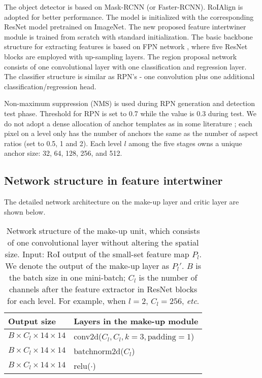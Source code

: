 \documentclass{article} \usepackage{iclr2019_conference,times}
\begin{document}
{
The object detector is based on Mask-RCNN (or Faster-RCNN).
RoIAlign is adopted for better performance. The model is initialized with the corresponding ResNet model pretrained on ImageNet. The new proposed feature intertwiner module is trained from scratch with standard initialization. The basic backbone structure for extracting features is based on FPN network \citep{lin2017_FPN}, where five ResNet blocks are employed with up-sampling layers. The region proposal network consists of one convolutional layer with one classification and regression layer.
The classifier structure is similar as RPN's - one convolution plus one additional classification/regression head.}

Non-maximum suppression (NMS) is used during RPN generation and detection test phase. Threshold for RPN is set to 0.7 while the value is 0.3 during test.
We do not adopt a dense allocation of anchor templates as in some literature \citep{liu2015_ssd,redmon2017_yolo_v1}; each pixel on a level only has the number of anchors the same as the number of aspect ratios (set to 0.5, 1 and 2). Each level $l$ among the five stages owns a unique anchor size: 32, 64, 128, 256, and 512.  
{
\subsection{Network structure in feature intertwiner}\label{sec:network_feat_inter}}

{	
The detailed network architecture on the make-up layer and critic layer are shown below.
}

\begin{table*}[h]
	\centering
	\begin{tabular}{   l |  l}
		Output size & Layers in the make-up module \\ \toprule
		$B \times C_l \times 14 \times 14$ & conv2d($C_l, C_l, k=3, \text{padding}=1$) \\
		$B \times C_l \times 14 \times 14$ & batchnorm2d($C_l$) \\
		$B \times C_l \times 14 \times 14$ & relu($\cdot$) \\
	\end{tabular}
	\vspace{-.2cm}
	\caption{
{
		Network structure of the make-up unit, which consists of one convolutional
layer without altering the spatial size. Input: RoI output of the small-set feature map $P_l$. We denote the output of the make-up layer as $P_l'$.
		$B$ is the batch size in one mini-batch; $C_l$ is the number of channels after the feature extractor in ResNet blocks for each level. For example, when $l=2$, $C_l=256$, \textit{etc}.}
	}\label{tab:make_up_layer}
\end{table*}
\end{document}
